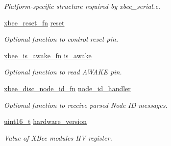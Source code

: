 \begin{DoxyCompactItemize}
\begin{DoxyCompactList}\small\item\em Platform-\/specific structure required by xbee\+\_\+serial.\+c. \end{DoxyCompactList}\item 
\mbox{\label{group__xbee__device_ga1f3cf44cb21be8f101d33062a9d2cf97}} 
\hyperlink{group__xbee__device_gaa6b2701f8516c2947424178c4bacab83}{xbee\+\_\+reset\+\_\+fn} \hyperlink{group__xbee__device_ga1f3cf44cb21be8f101d33062a9d2cf97}{reset}
\begin{DoxyCompactList}\small\item\em Optional function to control reset pin. \end{DoxyCompactList}\item 
\mbox{\label{group__xbee__device_gaf17bb63b8639d0278a2d0ad259865930}} 
\hyperlink{group__xbee__device_ga47d67ee70583d9a2a0cf7ae1eb672af8}{xbee\+\_\+is\+\_\+awake\+\_\+fn} \hyperlink{group__xbee__device_gaf17bb63b8639d0278a2d0ad259865930}{is\+\_\+awake}
\begin{DoxyCompactList}\small\item\em Optional function to read A\+W\+A\+KE pin. \end{DoxyCompactList}\item 
\mbox{\label{group__xbee__device_ga4952189ed8b46b133b5298b4fce75ab8}} 
\hyperlink{group__xbee__device_ga64bf72cf58030a080f12f8916cd7d2a2}{xbee\+\_\+disc\+\_\+node\+\_\+id\+\_\+fn} \hyperlink{group__xbee__device_ga4952189ed8b46b133b5298b4fce75ab8}{node\+\_\+id\+\_\+handler}
\begin{DoxyCompactList}\small\item\em Optional function to receive parsed Node ID messages. \end{DoxyCompactList}\item 
\mbox{\label{group__xbee__device_gad4c7c16c071f95965e2e506752b450fe}} 
\hyperlink{group__hal__dos_ga5a8b2dc9e45a9ee81a94ef304fb62505}{uint16\+\_\+t} \hyperlink{group__xbee__device_gad4c7c16c071f95965e2e506752b450fe}{hardware\+\_\+version}
\begin{DoxyCompactList}\small\item\em Value of X\+Bee module\textquotesingle{}s HV register. \end{DoxyCompactList}\item 

\end{DoxyCompactItemize}
